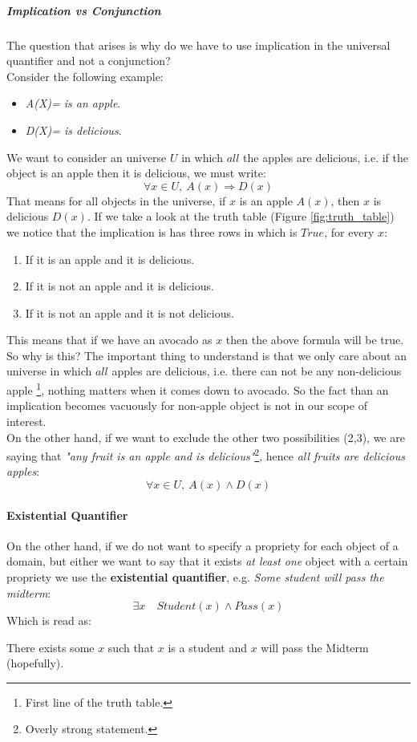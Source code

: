 \documentclass[10pt,a4paper]{article}
\begin{document}
\subparagraph{Implication vs Conjunction}
The question that arises is why do we have to use implication in the universal quantifier and not a conjunction?\\

Consider the following example:
\begin{itemize}
\item \textit{A(X)= is an apple}.
\item \textit{D(X)= is delicious}.
\end{itemize}

We want to consider an universe $U$ in which $all$ the apples are delicious, i.e. if the object is an apple then it is delicious, we must write:
\[\forall x\in U,\ A(x)\Rightarrow D(x)\]
That means for all objects in the universe, if $x$ is an apple $A(x)$, then $x$ is delicious $D(x)$. If we take a look at the truth table (Figure \ref{fig:truth_table}) we notice that the implication is has three rows in which is $True$, for every $x$:
\begin{enumerate}
\item If it is an apple and it is delicious.
\item If it is not an apple and it is delicious.
\item If it is not an apple and it is not delicious.
\end{enumerate}
This means that if we have an avocado as $x$ then the above formula will be true. So why is this?
The important thing to understand is that we only care about an universe in which $all$ apples are delicious, i.e. there can not be any non-delicious apple \footnote{First line of the truth table.}, nothing matters when it comes down to avocado. So the fact than an implication becomes vacuously for non-apple object is not in our scope of interest.\\
On the other hand, if we want to exclude the other two possibilities (2,3), we are saying that \textit{"any fruit is an apple and is delicious"}\footnote{Overly strong statement.}, hence \textit{all fruits are delicious apples}:
\[\forall x\in U,\ A(x) \wedge D(x)\]

\paragraph{Existential Quantifier}
On the other hand, if we do not want to specify a propriety for each object of a domain, but either we want to say that it exists \textit{at least one} object with a certain propriety we use the \textbf{existential quantifier}, e.g. \textit{Some student will pass the midterm}:
\[\exists x\quad Student(x) \wedge Pass(x)\]
Which is read as:
\begin{center}
There exists some $x$ such that $x$ is a student and $x$ will pass the Midterm (hopefully).
\end{center} 
\end{document}
